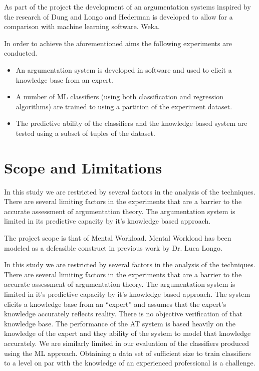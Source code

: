 As part of the project the development of an argumentation systems inspired by the research of Dung and Longo and Hederman is developed to allow for a comparison with machine learning software. Weka. 


In order to achieve the aforementioned aims the following experiments are conducted.

\begin{itemize}

  \item An argumentation system is developed in software and used to elicit a knowledge base from an expert.
  \item A number of ML classifiers (using both classification and regression algorithms) are trained to using a partition of the experiment dataset.
  \item The predictive ability of the classifiers and the knowledge based system are tested using a subset of tuples of the dataset.

\end{itemize}



\section{Scope and Limitations}


In this study we are restricted by several factors in the analysis of the techniques. There are several limiting factors in the experiments that are a barrier to the accurate assessment of argumentation theory. The argumentation system is limited in its predictive capacity by it’s knowledge based approach.

The project scope is that of Mental Workload. Mental Workload has been modeled as a defeasible construct in previous work by Dr. Luca Longo. 


In this study we are restricted by several factors in the analysis of the techniques.
There are several limiting factors in the experiments that are a barrier to the accurate assessment of argumentation theory.
The argumentation system is limited in it's predictive capacity by it's knowledge based approach.
The system elicits a knowledge base from an ``expert'' and assumes that the expert's knowledge accurately reflects reality.
There is no objective verification of that knowledge base. The performance of the AT system is based heavily on the knowledge of the expert and they ability of the system to model that knowledge accurately.
We are similarly limited in our evaluation of the classifiers produced using the ML approach.
Obtaining a data set of sufficient size to train classifiers to a level on par with the knowledge of an experienced professional is a challenge.

